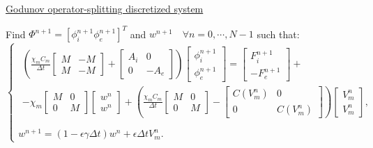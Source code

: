 \documentclass[9pt]{beamer}
\begin{document}
\begin{frame}
\begin{columns}
\begin{column}{0.5\textwidth}
            \end{column}
     \end{columns}
     \vspace{4mm}
\begin{center}
\underline{Godunov operator-splitting discretized system}
\end{center}
Find $\Phi^{n+1}=[\phi_i^{n+1} \phi_e^{n+1}]^T$ and $w^{n+1} \quad \forall n=0, \cdots, N-1$ such that: \small
\begin{equation*}
\begin{cases}
\begin{gathered}
\left(
\frac{\chi_m C_m}{\Delta t} \begin{bmatrix}M & -M \\ M & -M\end{bmatrix}
+ \begin{bmatrix} A_i & 0 \\ 0 & -A_e \end{bmatrix}
\right) \begin{bmatrix} \phi_i^{n+1} \\ \phi_e^{n+1}  \end{bmatrix} =
\begin{bmatrix} F_i^{n+1} \\ -F_e^{n+1} \end{bmatrix} + \\ -
\chi_m\begin{bmatrix} M & 0 \\ 0 & M \end{bmatrix} \begin{bmatrix} w^n \\ w^n \end{bmatrix} +
\left(\frac{\chi_mC_m}{\Delta t}\begin{bmatrix} M & 0 \\ 0 & M \end{bmatrix}
- \begin{bmatrix} C(V_m^n) & 0 \\ 0 & C(V_m^n)\end{bmatrix} 
\right) \begin{bmatrix} V_m^n \\ V_m^n \end {bmatrix},
\end{gathered} \\ \\
w^{n+1} = (1-\epsilon \gamma \Delta t) w^n + \epsilon \Delta tV_m^n.
\end{cases}
\end{equation*}

\end{frame}
\end{document}
